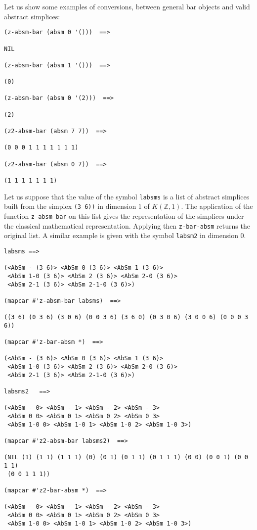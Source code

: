 Let us show some examples of conversions, between general bar objects and valid abstract simplices:
{\footnotesize\begin{verbatim}
(z-absm-bar (absm 0 '()))  ==>

NIL

(z-absm-bar (absm 1 '()))  ==>

(0)

(z-absm-bar (absm 0 '(2)))  ==>

(2)

(z2-absm-bar (absm 7 7))  ==>

(0 0 0 1 1 1 1 1 1 1)

(z2-absm-bar (absm 0 7))  ==>

(1 1 1 1 1 1 1)
\end{verbatim}}
Let us suppose that the value of the symbol {\tt labsms} is a list of
abstract simplices built from the simplex {\tt (3 6))} in dimension $1$ of $K(\mathbb{Z}, 1)$.
The application of the function {\tt z-absm-bar} on this list gives the representation
of the simplices under the classical mathematical representation. Applying then {\tt z-bar-absm}
returns the original list. A similar example is given with the symbol {\tt labsm2} in dimension $0$.
{\footnotesize\begin{verbatim}
labsms ==>

(<AbSm - (3 6)> <AbSm 0 (3 6)> <AbSm 1 (3 6)>
 <AbSm 1-0 (3 6)> <AbSm 2 (3 6)> <AbSm 2-0 (3 6)>
 <AbSm 2-1 (3 6)> <AbSm 2-1-0 (3 6)>)

(mapcar #'z-absm-bar labsms)  ==>

((3 6) (0 3 6) (3 0 6) (0 0 3 6) (3 6 0) (0 3 0 6) (3 0 0 6) (0 0 0 3 6))

(mapcar #'z-bar-absm *)  ==>

(<AbSm - (3 6)> <AbSm 0 (3 6)> <AbSm 1 (3 6)>
 <AbSm 1-0 (3 6)> <AbSm 2 (3 6)> <AbSm 2-0 (3 6)>
 <AbSm 2-1 (3 6)> <AbSm 2-1-0 (3 6)>)

labsms2   ==>

(<AbSm - 0> <AbSm - 1> <AbSm - 2> <AbSm - 3>
 <AbSm 0 0> <AbSm 0 1> <AbSm 0 2> <AbSm 0 3>
 <AbSm 1-0 0> <AbSm 1-0 1> <AbSm 1-0 2> <AbSm 1-0 3>)

(mapcar #'z2-absm-bar labsms2)  ==>

(NIL (1) (1 1) (1 1 1) (0) (0 1) (0 1 1) (0 1 1 1) (0 0) (0 0 1) (0 0 1 1)
 (0 0 1 1 1))

(mapcar #'z2-bar-absm *)  ==>

(<AbSm - 0> <AbSm - 1> <AbSm - 2> <AbSm - 3>
 <AbSm 0 0> <AbSm 0 1> <AbSm 0 2> <AbSm 0 3>
 <AbSm 1-0 0> <AbSm 1-0 1> <AbSm 1-0 2> <AbSm 1-0 3>)
\end{verbatim}}
\newpage

